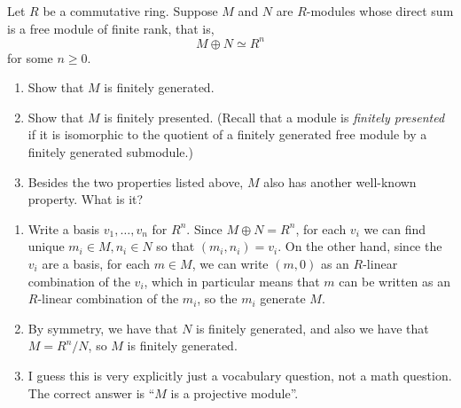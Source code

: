 \begin{question}[subtitle = August 2022 Problem 3,ID=Aug22_3]
Let $R$ be a commutative ring. Suppose $M$ and $N$ are $R$-modules whose direct sum is a free module of finite rank, that is,
\[M \oplus N \simeq R^n\]
for some $n \geq 0$.
\begin{enumerate}
    \item Show that $M$ is finitely generated.
    \item Show that $M$ is finitely presented. (Recall that a module is \emph{finitely presented} if it is isomorphic to the quotient of a finitely generated free module by a finitely generated submodule.)
    \item Besides the two properties listed above, $M$ also has another well-known property. What is it? %
\end{enumerate}
\end{question}
\begin{solution}
\begin{enumerate}
    \item Write a basis $v_1,\dots,v_n$ for $R^n$. Since $M \oplus N = R^n$, for each $v_i$ we can find unique $m_i \in M,n_i \in N$ so that $(m_i,n_i) = v_i$. On the other hand, since the $v_i$ are a basis, for each $m \in M$, we can write $(m,0)$ as an $R$-linear combination of the $v_i$, which in particular means that $m$ can be written as an $R$-linear combination of the $m_i$, so the $m_i$ generate $M$.
    \item By symmetry, we have that $N$ is finitely generated, and also we have that $M = R^n/N$, so $M$ is finitely generated.
    \item I guess this is very explicitly just a vocabulary question, not a math question. The correct answer is ``$M$ is a projective module''.
\end{enumerate}
\end{solution}

